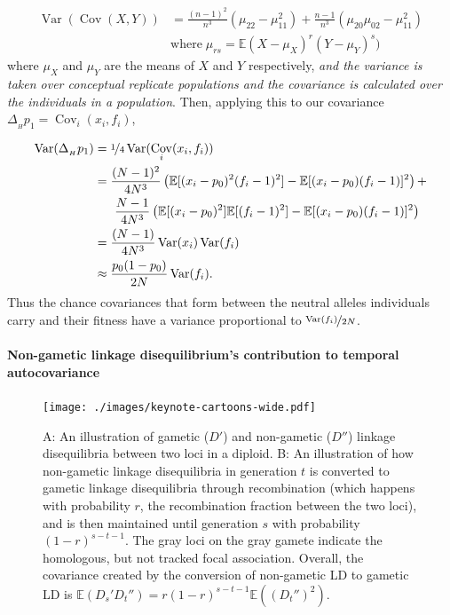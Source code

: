 \documentclass[11pt]{article}
\newcommand{\vb}[1]{{\it \color{blue} #1}}
\newcommand{\E}{\mathbb{E}}
\DeclareMathOperator{\var}{Var}
\DeclareMathOperator{\cov}{Cov}
\begin{document}
\begin{align}
  \var(\cov(X, Y)) &= \frac{(n-1)^2}{n^3} (\mu_{22} - \mu_{11}^2) + \frac{n-1}{n^3} (\mu_{20}\mu_{02} - \mu_{11}^2)  \\
                   &\text{where} \; \mu_{rs} = \E(X-\mu_X)^r(Y-\mu_Y)^s)
\end{align}
%
where $\mu_X$ and $\mu_Y$ are the means of $X$ and $Y$ respectively, \vb{and
the variance is taken over conceptual replicate populations and the covariance
is calculated over the individuals in a population}.  Then, applying this to
our covariance $\Delta_{_H} p_1 = \cov_i(x_i, f_i)$,

\begin{align}
  \label{eq:strength-assoc}
  \var(\Delta_{_H} p_1) &= \nicefrac{1}{4}\var(\cov_i(x_i, f_i)) \nonumber \\
                     &= \frac{(N-1)^2}{4N^3} \left(\E[(x_i - p_0)^2 (f_i - 1)^2] - \E[(x_i - p_0) (f_i - 1)]^2 \right)+ \nonumber \\
                     &\;\;\;\;\;\; \frac{N-1}{4N^3} \left(\E[(x_i - p_0)^2] \E[(f_i - 1)^2] - \E[(x_i -p_0)(f_i-1)]^2\right) \nonumber \\
                     &= \frac{(N-1)}{4N^3} \var(x_i) \var(f_i) \nonumber \\
                     &\approx \frac{p_0(1-p_0) }{2N} \var(f_i).
\end{align}
%
Thus the chance covariances that form between the neutral alleles individuals
carry and their fitness have a variance proportional to
$\nicefrac{\var(f_i)}{2N}$. 

\paragraph{Non-gametic linkage disequilibrium's contribution to temporal autocovariance}
\label{ap:non-gametic}

\begin{figure}[!ht]
  \centering
  \texttt{[image: ./images/keynote-cartoons-wide.pdf]}

  \caption{A: An illustration of gametic ($D'$) and non-gametic ($D''$) linkage
    disequilibria between two loci in a diploid. B: An illustration of how
    non-gametic linkage disequilibria in generation $t$ is converted to gametic
    linkage disequilibria through recombination (which happens with probability
    $r$, the recombination fraction between the two loci), and is then
    maintained until generation $s$ with probability $(1-r)^{s-t-1}$. The gray
    loci on the gray gamete indicate the homologous, but not tracked focal
    association. Overall, the covariance created by the conversion of non-gametic
    LD to gametic LD is $\E(D_{s}' D_{t}'') = r(1-r)^{s-t-1}\E\left((D_{t}'')^2\right)$.}

  \label{fig:ld-cartoon}
\end{figure}
\end{document}
